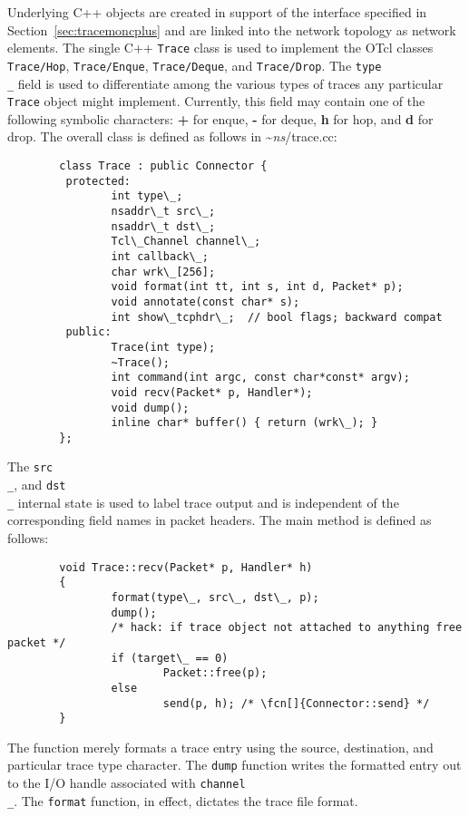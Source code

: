Underlying C++ objects are created in support of the interface specified
in Section~\ref{sec:tracemoncplus} and are linked into the network topology
as network elements.
The single C++ {\tt Trace} class is used to implement the OTcl
classes {\tt Trace/Hop}, {\tt Trace/Enque}, {\tt Trace/Deque},
and {\tt Trace/Drop}.
The {\tt type\\_} field is used to differentiate among the
various types of
traces any particular {\tt Trace} object might implement.
Currently, this field may contain one of the following symbolic characters:
{\bf +} for enque, {\bf -} for deque, {\bf h} for hop, and
{\bf d} for drop.
The overall class is defined as follows in \textasciitilde\emph{ns}/{trace.cc}:
\begin{verbatim}
        class Trace : public Connector {
         protected:
                int type\_;
                nsaddr\_t src\_;
                nsaddr\_t dst\_;
                Tcl\_Channel channel\_;
                int callback\_;
                char wrk\_[256];
                void format(int tt, int s, int d, Packet* p);
                void annotate(const char* s);
                int show\_tcphdr\_;  // bool flags; backward compat
         public:
                Trace(int type);
                ~Trace();
                int command(int argc, const char*const* argv);
                void recv(Packet* p, Handler*);
                void dump();
                inline char* buffer() { return (wrk\_); }
        };
\end{verbatim}
The {\tt src\\_}, and {\tt dst\\_} internal state is used
to label trace output and is independent of the corresponding field
names in packet headers.
The main  method is defined as follows:
\begin{verbatim}
        void Trace::recv(Packet* p, Handler* h)
        {
                format(type\_, src\_, dst\_, p);
                dump();
                /* hack: if trace object not attached to anything free packet */
                if (target\_ == 0)
                        Packet::free(p);
                else
                        send(p, h); /* \fcn[]{Connector::send} */
        }
\end{verbatim}
The function merely formats a trace entry using the source, destination,
and particular trace type character.
The {\tt dump} function writes the formatted entry out to the
I/O handle associated with {\tt channel\\_}.
The {\tt format} function, in effect, dictates the trace file format.

